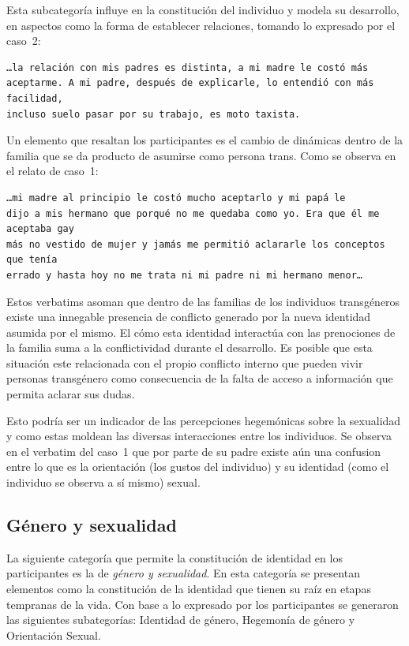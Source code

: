 Esta subcategoría influye en la constitución del individuo y modela su
desarrollo, en aspectos como la forma de establecer relaciones,
tomando lo expresado por el caso~2:

\begin{verbatim}
…la relación con mis padres es distinta, a mi madre le costó más
aceptarme. A mi padre, después de explicarle, lo entendió con más facilidad,
incluso suelo pasar por su trabajo, es moto taxista.
\end{verbatim}

Un elemento que resaltan los participantes es el cambio de dinámicas dentro de
la familia que se da producto de asumirse como persona trans. Como se observa en
el relato de caso~1:

\begin{verbatim}
…mi madre al principio le costó mucho aceptarlo y mi papá le
dijo a mis hermano que porqué no me quedaba como yo. Era que él me aceptaba gay
más no vestido de mujer y jamás me permitió aclararle los conceptos que tenía
errado y hasta hoy no me trata ni mi padre ni mi hermano menor…
\end{verbatim}

Estos verbatims asoman que dentro de las familias de los individuos transgéneros
existe una innegable presencia de conflicto generado por la nueva identidad
asumida por el mismo. El cómo esta identidad interactúa con las prenociones de
la familia suma a la conflictividad durante el desarrollo. Es posible que esta
situación este relacionada con el propio conflicto interno que pueden vivir
personas transgénero como consecuencia de la falta de acceso a información que
permita aclarar sus dudas.

Esto podría ser un indicador de las percepciones hegemónicas sobre la sexualidad
y como estas moldean las diversas interacciones entre los individuos. Se
observa en el verbatim del caso~1 que por parte de su padre existe aún una
confusion entre lo que es la orientación (los gustos del individuo) y su
identidad (como el individuo se observa a sí mismo) sexual.

\subsection{Género y sexualidad}

La siguiente categoría que permite la constitución de identidad en los
participantes es la de \emph{género y sexualidad}. En esta categoría se
presentan elementos como la constitución de la identidad que tienen su raíz en
etapas tempranas de la vida. Con base a lo expresado por los participantes se
generaron las siguientes subategorías: Identidad de género, Hegemonía de género
y Orientación Sexual.

